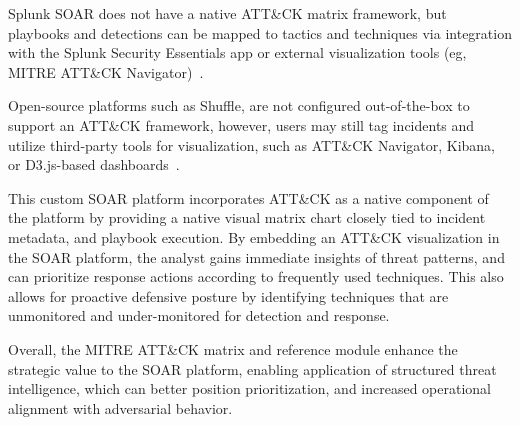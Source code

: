 Splunk SOAR does not have a native ATT\&CK matrix framework, but playbooks and detections can be mapped to tactics and techniques via integration with the Splunk Security Essentials app or external visualization tools (eg, MITRE ATT\&CK Navigator)~\cite{splunk}.

Open-source platforms such as Shuffle, are not configured out-of-the-box to support an ATT\&CK framework, however, users may still tag incidents and utilize third-party tools for visualization, such as ATT\&CK Navigator, Kibana, or D3.js-based dashboards~\cite{techtarget}.

This custom SOAR platform incorporates ATT\&CK as a native component of the platform by providing a native visual matrix chart closely tied to incident metadata, and playbook execution. By embedding an ATT\&CK visualization in the SOAR platform, the analyst gains immediate insights of threat patterns, and can prioritize response actions according to frequently used techniques. This also allows for proactive defensive posture by identifying techniques that are unmonitored and under-monitored for detection and response.

Overall, the MITRE ATT\&CK matrix and reference module enhance the strategic value to the SOAR platform, enabling application of structured threat intelligence, which can better position prioritization, and increased operational alignment with adversarial behavior.